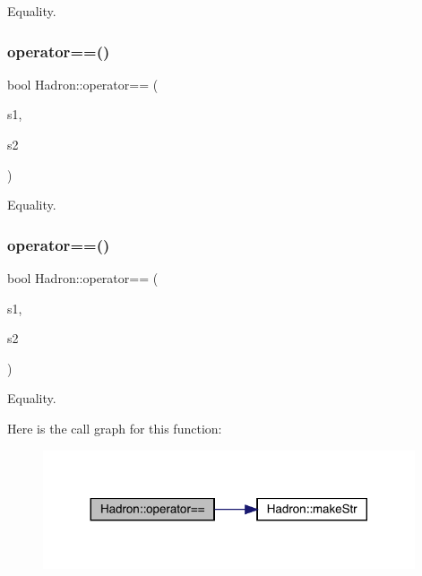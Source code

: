 Equality. 

\mbox{\label{namespaceHadron_ac884c28242a0aaf83a23169ef8ff5b2b}} 
\subsubsection{\texorpdfstring{operator==()}{operator==()}\hspace{0.1cm}{\footnotesize\ttfamily [3/5]}}
{\footnotesize\ttfamily bool Hadron\+::operator== (\begin{DoxyParamCaption}\item[{const \mbox{\hyperlink{structHadron_1_1KeyHadronNPartNPtConnGraph__t}{Key\+Hadron\+N\+Part\+N\+Pt\+Conn\+Graph\+\_\+t}} \&}]{s1,  }\item[{const \mbox{\hyperlink{structHadron_1_1KeyHadronNPartNPtConnGraph__t}{Key\+Hadron\+N\+Part\+N\+Pt\+Conn\+Graph\+\_\+t}} \&}]{s2 }\end{DoxyParamCaption})}



Equality. 

\mbox{\label{namespaceHadron_af09f672981980cb11de931b95576f828}} 
\subsubsection{\texorpdfstring{operator==()}{operator==()}\hspace{0.1cm}{\footnotesize\ttfamily [4/5]}}
{\footnotesize\ttfamily bool Hadron\+::operator== (\begin{DoxyParamCaption}\item[{const \mbox{\hyperlink{structHadron_1_1HadronVertex__t}{Hadron\+Vertex\+\_\+t}} \&}]{s1,  }\item[{const \mbox{\hyperlink{structHadron_1_1HadronVertex__t}{Hadron\+Vertex\+\_\+t}} \&}]{s2 }\end{DoxyParamCaption})}



Equality. 

Here is the call graph for this function\+:
\nopagebreak
\begin{figure}[H]
\begin{center}
\leavevmode
\includegraphics[width=311pt]{d1/daf/namespaceHadron_af09f672981980cb11de931b95576f828_cgraph}
\end{center}
\end{figure}
\mbox{\label{namespaceHadron_a9eb9233a6f185d9919fc72243524ee67}} 
